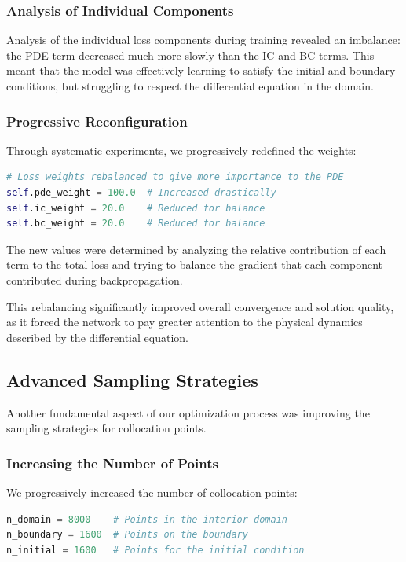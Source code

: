 \subsubsection{Analysis of Individual Components}

Analysis of the individual loss components during training revealed an imbalance: the PDE term decreased much more slowly than the IC and BC terms. This meant that the model was effectively learning to satisfy the initial and boundary conditions, but struggling to respect the differential equation in the domain.

\subsubsection{Progressive Reconfiguration}

Through systematic experiments, we progressively redefined the weights:
\begin{lstlisting}[language=Python]
# Loss weights rebalanced to give more importance to the PDE
self.pde_weight = 100.0  # Increased drastically
self.ic_weight = 20.0    # Reduced for balance
self.bc_weight = 20.0    # Reduced for balance
\end{lstlisting}

The new values were determined by analyzing the relative contribution of each term to the total loss and trying to balance the gradient that each component contributed during backpropagation.

This rebalancing significantly improved overall convergence and solution quality, as it forced the network to pay greater attention to the physical dynamics described by the differential equation.

\subsection{Advanced Sampling Strategies}

Another fundamental aspect of our optimization process was improving the sampling strategies for collocation points.

\subsubsection{Increasing the Number of Points}

We progressively increased the number of collocation points:
\begin{lstlisting}[language=Python]
n_domain = 8000    # Points in the interior domain
n_boundary = 1600  # Points on the boundary
n_initial = 1600   # Points for the initial condition
\end{lstlisting}

